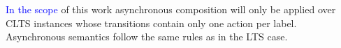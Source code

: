 
\textcolor{blue}{In the scope} of this work asynchronous composition will only be applied over CLTS instances whose transitions contain only one action per label. Asynchronous semantics follow the same rules as in the LTS case.


